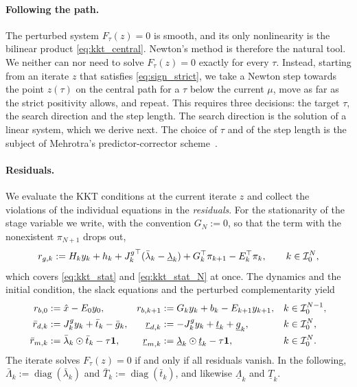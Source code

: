 \paragraph{Following the path.}
The perturbed system $F_\tau(z) = 0$ is smooth, and its only nonlinearity is the bilinear product \eqref{eq:kkt_central}.
Newton's method is therefore the natural tool.
We neither can nor need to solve $F_\tau(z) = 0$ exactly for every $\tau$.
Instead, starting from an iterate $z$ that satisfies \eqref{eq:sign_strict}, we take a Newton step towards the point $z(\tau)$ on the central path for a $\tau$ below the current $\mu$, move as far as the strict positivity allows, and repeat.
This requires three decisions: the target $\tau$, the search direction and the step length.
The search direction is the solution of a linear system, which we derive next.
The choice of $\tau$ and of the step length is the subject of Mehrotra's predictor-corrector scheme~\cite{mehrotra1992implementation}.

\paragraph{Residuals.}
We evaluate the KKT conditions at the current iterate $z$ and collect the violations of the individual equations in the \textit{residuals}.
For the stationarity of the stage variable we write, with the convention $G_N := 0$, so that the term with the nonexistent $\pi_{N+1}$ drops out,
\[
    r_{g,k} := H_k y_k + h_k + {J^{g}_{k}}^\top(\bar{\lambda}_k - \underline{\lambda}_k) + G_k^\top \pi_{k+1} - E_k^\top \pi_k ,
    \qquad k\in\mathcal{I}_{0}^{N},
\]
which covers \eqref{eq:kkt_stat} and \eqref{eq:kkt_stat_N} at once.
The dynamics and the initial condition, the slack equations and the perturbed complementarity yield
\begin{align*}
    r_{b,0} &:= \hat{x} - E_0 y_0 , &
    r_{b,k+1} &:= G_k y_k + b_k - E_{k+1} y_{k+1} , && k\in\mathcal{I}_{0}^{N-1}, \\
    \bar{r}_{d,k} &:= {J^{g}_{k}} y_k + \bar{t}_k - \bar{g}_k , &
    \underline{r}_{d,k} &:= -{J^{g}_{k}} y_k + \underline{t}_k + \underline{g}_k , && k\in\mathcal{I}_{0}^{N}, \\
    \bar{r}_{m,k} &:= \bar{\lambda}_k \odot \bar{t}_k - \tau \mathbf{1} , &
    \underline{r}_{m,k} &:= \underline{\lambda}_k \odot \underline{t}_k - \tau \mathbf{1} , && k\in\mathcal{I}_{0}^{N}.
\end{align*}
The iterate solves $F_\tau(z) = 0$ if and only if all residuals vanish.
In the following, $\bar{\Lambda}_k := \operatorname{diag}(\bar{\lambda}_k)$ and $\bar{T}_k := \operatorname{diag}(\bar{t}_k)$, and likewise $\underline{\Lambda}_k$ and $\underline{T}_k$.

